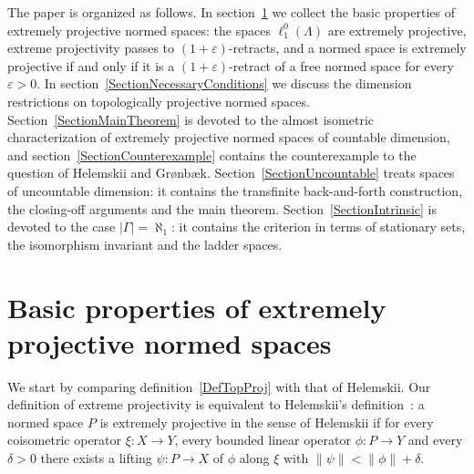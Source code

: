 \documentclass[12pt]{article}
\newcommand{\lo}[1]{\ell_1^0(#1)}
\newcommand{\norm}[1]{\lVert #1\rVert}
\begin{document}
The paper is organized as follows. In section~\ref{SectionBasicTheory} we
collect the basic properties of extremely projective normed spaces: the
spaces $\lo{\Lambda}$ are extremely projective, extreme projectivity passes
to $(1+\varepsilon)$-retracts, and a normed space is extremely projective if
and only if it is a $(1+\varepsilon)$-retract of a free normed space for every
$\varepsilon>0$. In section~\ref{SectionNecessaryConditions} we discuss the
dimension restrictions on topologically projective normed spaces.
Section~\ref{SectionMainTheorem} is devoted to the almost isometric
characterization of extremely projective normed spaces of countable
dimension, and section~\ref{SectionCounterexample} contains the
counterexample to the question of Helemskii and Gr{\o}nb{\ae}k.
Section~\ref{SectionUncountable} treats spaces of uncountable dimension: it
contains the transfinite back-and-forth construction, the closing-off
arguments and the main theorem. Section~\ref{SectionIntrinsic} is devoted to
the case $|\Gamma|=\aleph_1$: it contains the criterion in terms of
stationary sets, the isomorphism invariant and the ladder spaces.


\section{Basic properties of extremely projective normed
  spaces}\label{SectionBasicTheory}

We start by comparing definition~\ref{DefTopProj} with that of Helemskii.
Our definition of extreme projectivity is equivalent to Helemskii's
definition~\cite[definition I]{HelExtrProjSeqAlg}: a normed space $P$ is
extremely projective in the sense of Helemskii if for every coisometric operator
$\xi:X\to Y$, every bounded linear operator $\phi:P\to Y$ and every
$\delta>0$ there exists a lifting $\psi:P\to X$ of $\phi$ along $\xi$ with
$\norm{\psi}<\norm{\phi}+\delta$.
\end{document}

